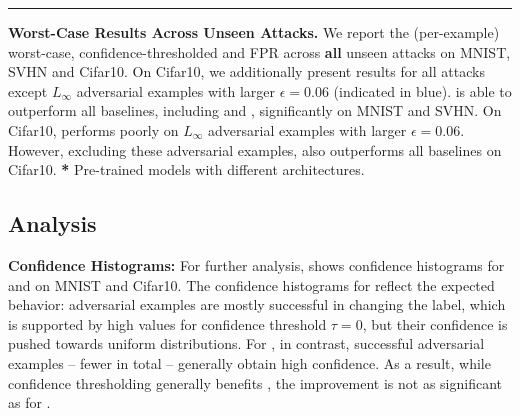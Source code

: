 \begin{table}
    \centering
    \begin{subfigure}{0.235\textwidth}
        
    \end{subfigure}
    \begin{subfigure}{0.125\textwidth}
        
    \end{subfigure}
    \begin{subfigure}{0.125\textwidth}
        
    \end{subfigure}
    \hspace*{0px}
    {\color{gray}\rule[-2.75cm]{1px}{5.75cm}}
    \hspace*{0.5px}
    \begin{subfigure}{0.125\textwidth}
        
    \end{subfigure}
    \caption{\textbf{Worst-Case Results Across \textcolor{colorbrewer1}{Unseen} Attacks.} We report the (per-example) worst-case, confidence-thresholded \RTE and FPR across \textbf{all} unseen attacks on MNIST, SVHN and Cifar10. On Cifar10, we additionally present results for all attacks except $L_\infty$ adversarial examples with larger $\epsilon=0.06$ (indicated in \textcolor{colorbrewer2}{blue}). \ConfTrain is able to outperform all baselines, including \Wong and \TRADES, significantly on MNIST and SVHN. On Cifar10, \ConfTrain performs poorly on $L_\infty$ adversarial examples with larger $\epsilon = 0.06$. However, excluding these adversarial examples, \ConfTrain also outperforms all baselines on Cifar10. \textbf{*} Pre-trained models with different architectures.}
    \label{tab:supp-experiments-all}
\end{table}

\subsection{Analysis}
\label{subsec:supp-experiments-analysis}

\textbf{Confidence Histograms:}
%
For further analysis,  shows confidence histograms for \AdvTrain and \ConfTrain on MNIST and Cifar10. The confidence histograms for \ConfTrain reflect the expected behavior: adversarial examples are mostly successful in changing the label, which is supported by high \RTE values for confidence threshold $\tau = 0$, but their confidence is pushed towards uniform distributions. For \AdvTrain, in contrast, successful adversarial examples -- fewer in total -- generally obtain high confidence. As a result, while confidence thresholding generally benefits \AdvTrain, the improvement is not as significant as for \ConfTrain.

